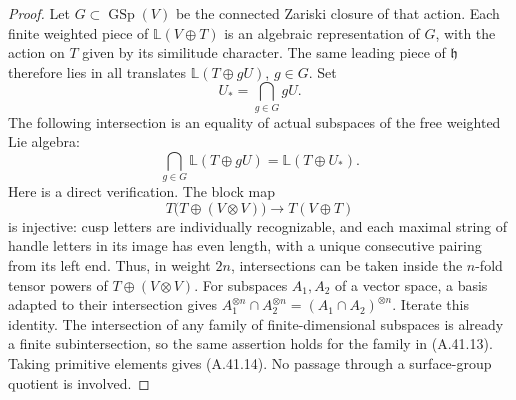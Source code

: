 \begin{proof}
Let \(G\subset\operatorname{GSp}(V)\) be the
connected Zariski closure of that action. Each finite
weighted piece of \(\mathbb L(V\oplus T)\) is an
algebraic representation of \(G\), with the action on
\(T\) given by its similitude character. The same
leading piece of \(\mathfrak h\) therefore lies in
all translates \(\mathbb L(T\oplus gU)\),
\(g\in G\). Set
\[
                           U_* =\bigcap_{g\in G}gU.
                                                               \tag{A.41.13}
\]
The following intersection is an equality of actual
subspaces of the free weighted Lie algebra:
\[
        \bigcap_{g\in G}\mathbb L(T\oplus gU)
                                    =\mathbb L(T\oplus U_*).
                                                               \tag{A.41.14}
\]
Here is a direct verification. The block map
\[
          T\bigl(T\oplus(V\otimes V)\bigr)
                               \longrightarrow T(V\oplus T)
\]
is injective: cusp letters are individually recognizable,
and each maximal string of handle letters in its image
has even length, with a unique consecutive pairing from
its left end. Thus, in weight \(2n\), intersections
can be taken inside the \(n\)-fold tensor powers of
\(T\oplus(V\otimes V)\). For subspaces \(A_1,A_2\)
of a vector space, a basis adapted to their intersection
gives
\(A_1^{\otimes n}\cap A_2^{\otimes n}
=(A_1\cap A_2)^{\otimes n}\). Iterate this identity.
The intersection of any family of finite-dimensional
subspaces is already a finite subintersection, so the
same assertion holds for the family in (A.41.13).
Taking primitive elements gives (A.41.14). No passage
through a surface-group quotient is involved.


\end{proof}
